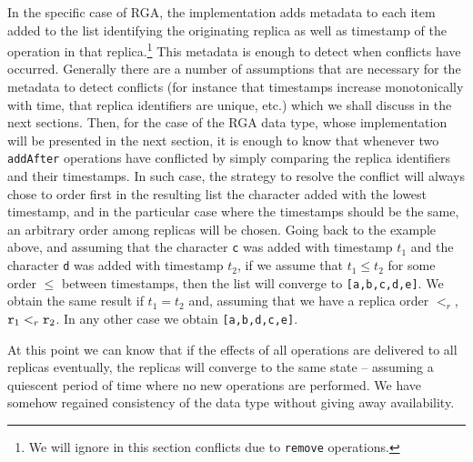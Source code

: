 

In the specific case of RGA, the implementation adds metadata to each
item added to the list identifying the originating replica as well as
timestamp of the operation in that replica.\footnote{We will ignore in
  this section conflicts due to \lstinline|remove| operations.}
%
This metadata is enough to detect when conflicts have occurred.
%
Generally there are a number of assumptions that are necessary for the
metadata to detect conflicts (for instance that timestamps increase
monotonically with time, that replica identifiers are unique, etc.)
which we shall discuss in the next sections.
%
Then, for the case of the RGA data type, whose implementation will be
presented in the next section, it is enough to know that whenever
two \lstinline|addAfter| operations have conflicted by simply
comparing the replica identifiers and their timestamps.
%
In such case, the strategy to resolve the conflict will always chose
to order first in the resulting list the character added with the
lowest timestamp, and in the particular case where the timestamps
should be the same, an arbitrary order among replicas will be chosen.
%
Going back to the example above, and assuming that the character
\lstinline|c| was added with timestamp $t_1$ and the character
\lstinline|d| was added with timestamp $t_2$, if we assume that $t_1 \leq
t_2$ for some order $\leq$ between timestamps, then the list will
converge to \lstinline|[a,b,c,d,e]|.
%
We obtain the same result if $t_1 = t_2$ and, assuming that we have a replica
order $<_r$, $\mathtt{r}_1 <_r \mathtt{r}_2$.
%
In any other case we obtain \lstinline|[a,b,d,c,e]|.

At this point we can know that if the effects of all operations are
delivered to all replicas eventually, the replicas will converge to
the same state -- assuming a quiescent period of time where no new
operations are performed.
%
We have somehow regained consistency of the data type without
giving away availability.

